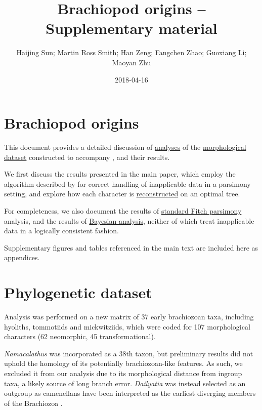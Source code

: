 \documentclass[openany]{book}
\title{Brachiopod origins -- Supplementary material}
\author{Haijing Sun; Martin Ross Smith; Han Zeng; Fangchen Zhao; Guoxiang Li;
Maoyan Zhu}
\date{2018-04-16}
\theoremstyle{definition}
\theoremstyle{definition}
\theoremstyle{definition}
\theoremstyle{remark}
\begin{document}
\maketitle

{
\setcounter{tocdepth}{1}
\tableofcontents
}
\hypertarget{brachiopod-origins}{%
\chapter*{Brachiopod origins}\label{brachiopod-origins}}

This document provides a detailed discussion of
\protect\hyperlink{treesearch}{analyses} of the
\protect\hyperlink{dataset}{morphological dataset} constructed to
accompany \citet{Sun2018Hyolithswith}, and their results.

We first discuss the results presented in the main paper, which employ
the algorithm described by \citet{Brazeau2018} for correct handling of
inapplicable data in a parsimony setting, and explore how each character
is \protect\hyperlink{reconstructions}{reconstructed} on an optimal
tree.

For completeness, we also document the results of
\protect\hyperlink{fitch}{standard Fitch parsimony} analysis, and the
results of \protect\hyperlink{bayesian}{Bayesian analysis}, neither of
which treat inapplicable data in a logically consistent fashion.

Supplementary figures and tables referenced in the main text are
included here as appendices.

\hypertarget{dataset}{%
\chapter{Phylogenetic dataset}\label{dataset}}

Analysis was performed on a new matrix of 37 early brachiozoan taxa,
including hyoliths, tommotiids and mickwitziids, which were coded for
107 morphological characters (62 neomorphic, 45 transformational).

\emph{Namacalathus} was incorporated as a 38th taxon, but preliminary
results did not uphold the homology of its potentially brachiozoan-like
features. As such, we excluded it from our analysis due to its
morphological distance from ingroup taxa, a likely source of long branch
error. \emph{Dailyatia} was instead selected as an outgroup as
camenellans have been interpreted as the earliest diverging members of
the Brachiozoa \citep{Skovsted2015Theearly, Zhao2017}.
\end{document}
